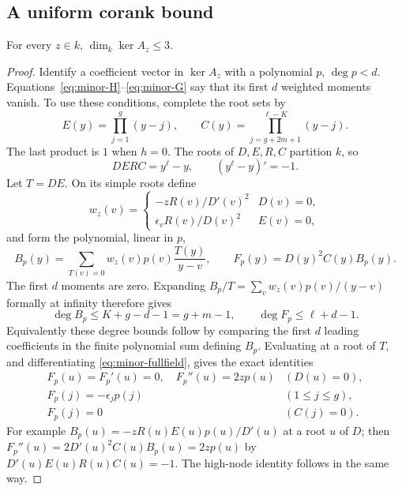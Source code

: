 \subsection{A uniform corank bound}
\begin{lemma}\label{lem:minor-corank}
For every $z\in k$, $\dim_k\ker A_z\le3$.
\end{lemma}
\begin{proof}
Identify a coefficient vector in $\ker A_z$ with a polynomial $p$, $\deg p<d$.
Equations~\eqref{eq:minor-H}--\eqref{eq:minor-G} say that its first $d$
weighted moments vanish. To use these conditions, complete the root sets by
\[
 E(y)=\prod_{j=1}^{g}(y-j),\qquad
 C(y)=\prod_{j=g+2m+1}^{\ell-K}(y-j).
\]
The last product is $1$ when $h=0$. The roots of $D,E,R,C$ partition $k$, so
\begin{equation}\label{eq:minor-fullfield}
 DERC=y^\ell-y,\qquad (y^\ell-y)'=-1.
\end{equation}
Let $T=DE$. On its simple roots define
\[
 w_z(v)=\begin{cases}
 -zR(v)/D'(v)^2&D(v)=0,\\
 \epsilon_v R(v)/D(v)^2&E(v)=0,
 \end{cases}
\]
and form the polynomial, linear in $p$,
\[
 B_p(y)=\sum_{T(v)=0}w_z(v)p(v)\frac{T(y)}{y-v},\qquad
 F_p(y)=D(y)^2C(y)B_p(y).
\]
The first $d$ moments are zero. Expanding
$B_p/T=\sum_v w_z(v)p(v)/(y-v)$ formally at infinity therefore gives
\[
 \deg B_p\le K+g-d-1=g+m-1,\qquad \deg F_p\le\ell+d-1.
\]
Equivalently these degree bounds follow by comparing the first $d$ leading
coefficients in the finite polynomial sum defining $B_p$.
Evaluating at a root of $T$, and differentiating
\eqref{eq:minor-fullfield}, gives the exact identities
\begin{equation}\label{eq:minor-interpolation}
 \begin{array}{ll}
 F_p(u)=F_p'(u)=0,\quad F_p''(u)=2zp(u)&(D(u)=0),\\
 F_p(j)=-\epsilon_jp(j)&(1\le j\le g),\\
 F_p(j)=0&(C(j)=0).
 \end{array}
\end{equation}
For example $B_p(u)=-zR(u)E(u)p(u)/D'(u)$ at a root $u$ of $D$;
then $F_p''(u)=2D'(u)^2C(u)B_p(u)=2zp(u)$ by
$D'(u)E(u)R(u)C(u)=-1$. The high-node identity follows in the same way.


\end{proof}
